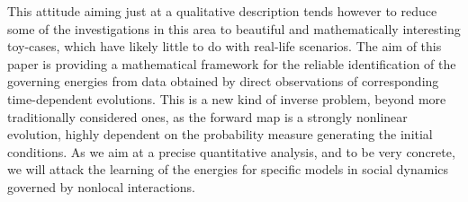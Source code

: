 This attitude aiming just at a qualitative description tends however to reduce  some of the investigations in this area to  beautiful and mathematically interesting toy-cases, which have likely little to do with real-life scenarios. 
The aim of this paper is providing a  mathematical framework for the reliable identification of the governing energies from data obtained by direct observations of corresponding time-dependent evolutions. This is a new kind of inverse problem, beyond more traditionally considered ones, as the forward map is a strongly nonlinear  evolution, highly dependent on the probability measure generating the initial conditions. As we aim at a precise quantitative analysis, and to be very concrete, we will  attack the learning of the energies for specific models in social dynamics governed by nonlocal interactions.


